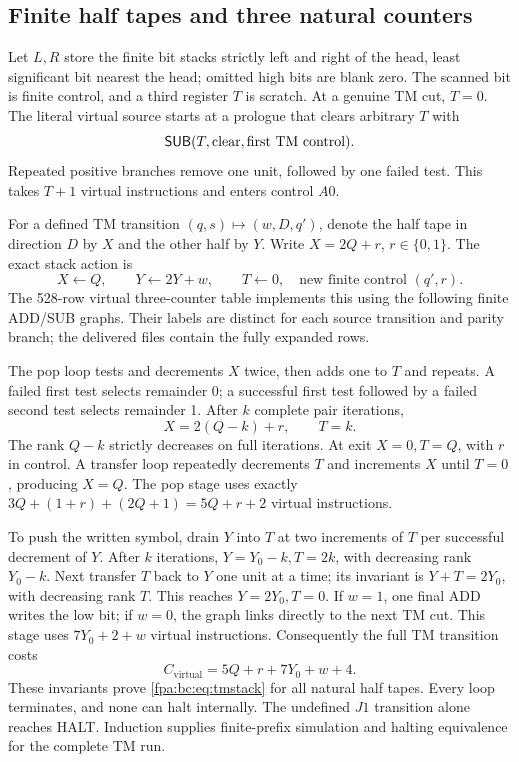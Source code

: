 \documentclass[11pt,a4paper]{article}
\numberwithin{equation}{section}
\begin{document}
\subsection{Finite half tapes and three natural counters}
Let $L,R$ store the finite bit stacks strictly left and right of the head,
least significant bit nearest the head; omitted high bits are blank zero.
The scanned bit is finite control, and a third register $T$ is scratch.
At a genuine TM cut, $T=0$. The literal virtual source starts at a prologue
that clears arbitrary $T$ with
\[
 \mathsf{SUB}(T,\text{clear},\text{first TM control}).
\]
Repeated positive branches remove one unit, followed by one failed test.
This takes $T+1$ virtual instructions and enters control $A0$.

For a defined TM transition $(q,s)\mapsto(w,D,q')$, denote the half tape in
direction $D$ by $X$ and the other half by $Y$. Write $X=2Q+r$, $r\in\{0,1\}$.
The exact stack action is
\begin{equation}
 X\gets Q,\qquad Y\gets2Y+w,\qquad T\gets0,
 \quad\text{new finite control }(q',r).\label{fpa:bc:eq:tmstack}
\end{equation}
The 528-row virtual three-counter table implements this using the following
finite ADD/SUB graphs. Their labels are distinct for each source transition
and parity branch; the delivered files contain the fully expanded rows.

The pop loop tests and decrements $X$ twice, then adds one to $T$ and repeats.
A failed first test selects remainder 0; a successful first test followed by
a failed second test selects remainder 1. After $k$ complete pair iterations,
\[
 X=2(Q-k)+r,\qquad T=k.
\]
The rank $Q-k$ strictly decreases on full iterations. At exit $X=0,T=Q$,
with $r$ in control. A transfer loop repeatedly decrements $T$ and increments
$X$ until $T=0$, producing $X=Q$. The pop stage uses exactly
$3Q+(1+r)+(2Q+1)=5Q+r+2$ virtual instructions.

To push the written symbol, drain $Y$ into $T$ at two increments of $T$ per
successful decrement of $Y$. After $k$ iterations,
$Y=Y_0-k,T=2k$, with decreasing rank $Y_0-k$. Next transfer $T$ back to $Y$
one unit at a time; its invariant is $Y+T=2Y_0$, with decreasing rank $T$.
This reaches $Y=2Y_0,T=0$. If $w=1$, one final ADD writes the low bit; if
$w=0$, the graph links directly to the next TM cut. This stage uses
$7Y_0+2+w$ virtual instructions. Consequently the full TM transition costs
\begin{equation}
 C_{\mathrm{virtual}}=5Q+r+7Y_0+w+4.\label{fpa:bc:eq:virtualclock}
\end{equation}
These invariants prove \eqref{fpa:bc:eq:tmstack} for all natural half tapes.
Every loop terminates, and none can halt internally. The undefined $J1$
transition alone reaches HALT. Induction supplies finite-prefix simulation
and halting equivalence for the complete TM run.
\end{document}
